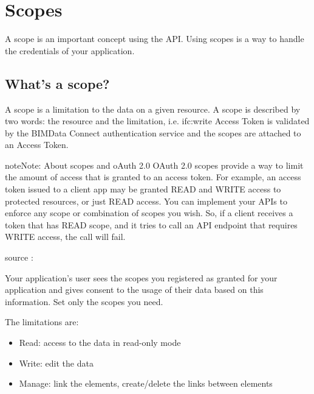 \documentclass[a4paper,12pt,english]{sphinxmanual}
\begin{document}
\section{Scopes}
\label{\detokenize{concepts/scopes:scopes}}\label{\detokenize{concepts/scopes::doc}}
A scope is an important concept using the API. Using scopes is a way to handle the credentials of your application.


\subsection{What’s a scope?}
\label{\detokenize{concepts/scopes:what-s-a-scope}}
A scope is a limitation to the data on a given resource. A scope is described by two words: the resource and the limitation, i.e. ifc:write
Access Token is validated by the BIMData Connect authentication service and the scopes are attached to an Access Token.

\begin{sphinxadmonition}{note}{Note:}
About scopes and oAuth 2.0
OAuth 2.0 scopes provide a way to limit the amount of access that is granted to an access token.
For example, an access token issued to a client app may be granted READ and WRITE access to protected resources, or just READ access. You can implement your APIs to enforce any scope or combination of scopes you wish. So, if a client receives a token that has READ scope, and it tries to call an API endpoint that requires WRITE access, the call will fail.

source : 
\end{sphinxadmonition}

Your application’s user sees the scopes you registered as granted for your application and gives consent to the usage of their data based on this information. Set only the scopes you need.

The limitations are:
\begin{itemize}
\item {} 
Read: access to the data in read-only mode

\item {} 
Write: edit the data

\item {} 
Manage: link the elements, create/delete the links between elements

\end{itemize}
\end{document}

